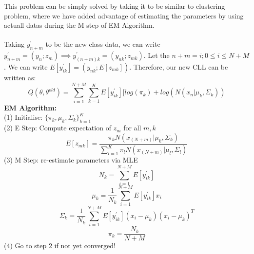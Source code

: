 \documentclass[a4paper,11pt]{article}
\begin{document}
\begin{mlsolution}
\noindent
This problem can be simply solved by taking it to be similar to clustering problem, where we have added advantage of estimating the parameters by using actuall datas during the M step of EM Algorithm. \\ \\
Taking $y_{n+m}^{'}$ to be the new class data, we can write $y_{n+m}^{'} = (y_{n}; z_{m}) \implies y_{(n+m)k}^{'} = (y_{nk}; z_{mk})$. Let the $n+m = i; 0 \leq i \leq N+M$. We can write $E[y_{ik}^{'}] = (y_{nk}; E[z_{mk}])$. Therefore, our new CLL can be written as:
\begin{equation}
  Q(\theta, \theta^{old}) = \sum_{i=1}^{N+M}\sum_{k=1}^{K} E[y_{ik}^{'}][log(\pi_{k}) + log(N(x_{n}|\mu_{k}, \Sigma_{k}))
\end{equation}
\textbf{EM Algorithm:} \\
(1) Initialise: $\{\pi_{k}, \mu_{k}, \Sigma_{k}\}_{k=1}^{K}$\\
(2) E Step: Compute expectation of $z_{m}$ for all $m, k$
\begin{equation}
  E[z_{mk}] = \frac{\pi_{k}N(x_{(N+m)}|\mu_{k},\Sigma_{k})}{\sum_{l=1}^{K}\pi_{l}N(x_{(N+m)}|\mu_{l},\Sigma_{l})}
\end{equation}
(3) M Step: re-estimate parameters via MLE
\begin{equation}
  N_{k} = \sum_{i=1}^{N+M}E[y_{ik}^{'}]
\end{equation}
\begin{equation}
  \mu_{k} = \frac{1}{N_{k}}\sum_{i=1}^{N+M}E[y_{ik}^{'}]x_{i}
\end{equation}
\begin{equation}
  \Sigma_{k} = \frac{1}{N_{k}}\sum_{i=1}^{N+M}E[y_{ik}^{'}](x_{i} - \mu_{k})(x_{i} - \mu_{k})^{T}
\end{equation}
\begin{equation}
  \pi_{k} = \frac{N_{k}}{N+M}
\end{equation}
(4) Go to step 2 if not yet converged!

\end{mlsolution}
\end{document}
